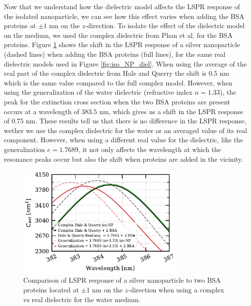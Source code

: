 Now that we understand how the dielectric model affects the LSPR response of the isolated nanoparticle, we can see how this 
effect varies when adding the BSA proteins at $\pm1$ nm on the $z$-direction. To isolate the effect of the dielectric model on the 
medium, we used the complex dielectric from Phan et al. \cite{PhanETal2013} for the BSA proteins. Figure \ref{fig:real_w_comp_bsa}
shows the shift in the LSPR response of a silver nanoparticle (dashed lines) when adding the BSA proteins (full lines), for the same 
real dielectric models used in Figure \ref{fig:iso_NP_diel}. When using the average of the real part of the complex dielectric from 
Hale and Querry \cite{HaleQuerry1972} the shift is $0.5$ nm which is the same value compared to the full complex model. However, when using 
the generalization of the water dielectric (refractive index $n=1.33$), the peak for the extinction cross section when the two BSA proteins are
present occurs at a wavelength of $383.5$ nm, which gives us a shift in the LSPR response of $0.75$ nm. These results tell us that there is no 
difference in the LSPR response, wether we use the complex dielectric for the water or an averaged value of its real component. However, when using a
different real value for the dielectric, like the generalization $e=1.7689$, it not only affects the wavelength at which the resonance peaks occur
but also the shift when proteins are added in the vicinity. 

 \begin{figure} %
    \centering
    \includegraphics[width=0.75\textwidth]{bsa_w_real_water_diel.pdf} 
    \caption{Comparison of LSPR response of a silver nanoparticle to two BSA proteins located at $\pm1$ nm on the $z$-direction
    when using a complex vs real dielectric for the water medium.}
    \label{fig:real_w_comp_bsa}
 \end{figure}

